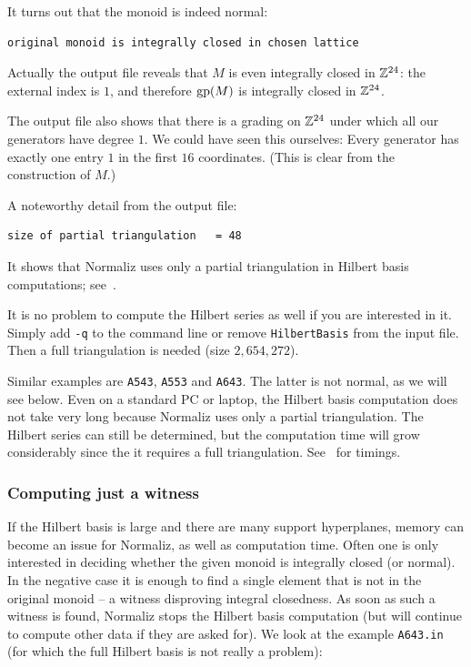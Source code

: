 It turns out that the monoid is indeed normal:
\begin{Verbatim}
original monoid is integrally closed in chosen lattice
\end{Verbatim}
Actually the output file reveals that $M$ is even integrally closed in ${\mathbb Z}^{24}$: the external index is $1$, and therefore $\operatorname{gp}(M)$ is integrally closed in ${\mathbb Z}^{24} $.

The output file also shows that there is a grading on ${\mathbb Z}^{24}$ under which all our generators have degree $1$. We could have seen this ourselves: Every generator has exactly one entry $1$ in the first $16$ coordinates. (This is clear from the construction of $M$.)

A noteworthy detail from the output file:
\begin{Verbatim}
size of partial triangulation   = 48
\end{Verbatim}
It shows that Normaliz uses only a partial triangulation in Hilbert basis computations; see~\cite{BHIKS}.

It is no problem to compute the Hilbert series as well if you are interested in it. Simply add \verb|-q| to the command line or remove \verb|HilbertBasis| from the input file. Then a full triangulation is needed (size $2,654,272$).

Similar examples are \verb|A543|, \verb|A553| and \verb|A643|. The latter is not normal, as we will see below. Even on a standard PC or laptop, the Hilbert basis computation does not take very long because Normaliz uses only a partial triangulation. The Hilbert series can still be determined, but the computation time will grow considerably since the it requires a full triangulation. See~\cite{BIS} for timings.

\subsubsection{Computing just a witness}\label{IsIC}

If the Hilbert basis is large and there are many support hyperplanes, memory can become an issue for Normaliz, as well as computation time. Often one is only interested in deciding whether the given monoid is integrally closed (or normal). In the negative case it is enough to find a single element that is not in the original monoid -- a witness disproving integral closedness. As soon as such a witness is found, Normaliz stops the Hilbert basis computation (but will continue to compute other data if they are asked for). We look at the example \verb|A643.in| (for which the full Hilbert basis is not really a problem):


